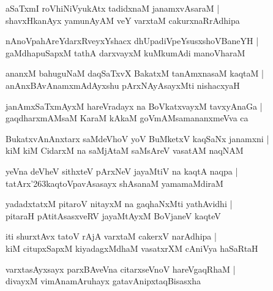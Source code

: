 \begin{shloka}
aSaTxmI roVhiNiVyukAtx tadidxnaM janamxvAsaraM |\\
shavxHkanAyx yamunAyAM veY varxtaM cakurxnaRrAdhipa
\end{shloka}

\begin{shloka}
nAnoVpahAreYdarxRveyxYshacx dhUpadiVpeYsusxshoVBaneYH |\\
gaMdhapuSapxM tathA darxvayxM kuMkumAdi manoVharaM
\end{shloka}

\begin{shloka}
ananxM bahuguNaM daqSaTxvX BakatxM tanAmxnasaM kaqtaM |\\
anAnxBAvAnamxmAdAyxshu pArxNAyAsayxMti nishacxyaH
\end{shloka}

\begin{shloka}
janAmxSaTxmAyxM hareVradayx na BoVkatxvayxM tavxyAnaGa |\\
gaqdharxmAMsaM KaraM kAkaM goVmAMsamananxmeVva ca
\end{shloka}

\begin{shloka}
BukatxvAnAnxtarx saMdeVhoV yoV BuMketxV kaqSaNx janamxni |\\
kiM kiM CidarxM na saMjAtaM saMsAreV vasatAM naqNAM
\end{shloka}

\begin{shloka}
yeVna deVheV sithxteV pArxNeV jayaMtiV na kaqtA naqpa |\\
tatArx\char'263kaqtoVpavAsasayx shAsanaM yamamaMdiraM
\end{shloka}

\begin{shloka}
yadadxtatxM pitaroV nitayxM na gaqhaNxMti yathAvidhi |\\
pitaraH pAtitAsasxveRV jayaMtAyxM BoVjaneV kaqteV
\end{shloka}

\begin{shloka}
iti shurxtAvx tatoV rAjA varxtaM cakerxV narAdhipa |\\
kiM citupxSapxM kiyadagxMdhaM vasatxrXM cAniVya haSaRtaH
\end{shloka}

\begin{shloka}
varxtasAyxsayx parxBAveVna citarxseVnoV hareVgaqRhaM |\\
divayxM vimAnamAruhayx gatavAnipxtaqBisasxha
\end{shloka}

